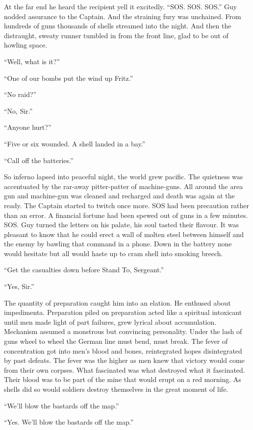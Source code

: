 At the far end he heard the recipient yell it excitedly. ``SOS. SOS. SOS.'' Guy nodded assurance to the Captain. And the straining fury was unchained. From hundreds of guns thousands of shells streamed into the night. And then the distraught, sweaty runner tumbled in from the front line, glad to be out of howling space.

``Well, what is it?''

``One of our bombs put the wind up Fritz.''

``No raid?''

``No, Sir.''

``Anyone hurt?''

``Five or six wounded. A shell landed in a bay.''

``Call off the batteries.''

So inferno lapsed into peaceful night, the world grew pacific. The quietness was accentuated by the rar-away pitter-patter of machine-guns. All around the area gun and machine-gun was cleaned and recharged and death was again at the ready. The Captain started to twitch once more. SOS had been precaution rather than an error. A financial fortune had been spewed out of guns in a few minutes. SOS. Guy turned the letters on his palate, his soul tasted their flavour. It was pleasant to know that he could erect a wall of molten steel between himself and the enemy by bawling that command in a phone. Down in the battery none would hesitate but all would haste up to cram shell into smoking breech.

``Get the casualties down before Stand To, Sergeant.''

``Yes, Sir.''

The quantity of preparation caught him into an elation. He enthused about impedimenta. Preparation piled on preparation acted like a spiritual intoxicant until men made light of part failures, grew lyrical about accumulation. Mechanism assumed a monstrous but convincing personality. Under the lash of guns wheel to wheel the German line must bend, must break. The fever of concentration got into men's blood and bones, reintegrated hopes disintegrated by past defeats. The fever was the higher as men knew that victory would come from their own corpses. What fascinated was what destroyed what it fascinated. Their blood was to be part of the mine that would erupt on a red morning. As shells did so would soldiers destroy themselves in the great moment of life.

``We'll blow the bastards off the map.''

``Yes. We'll blow the bastards off the map.''